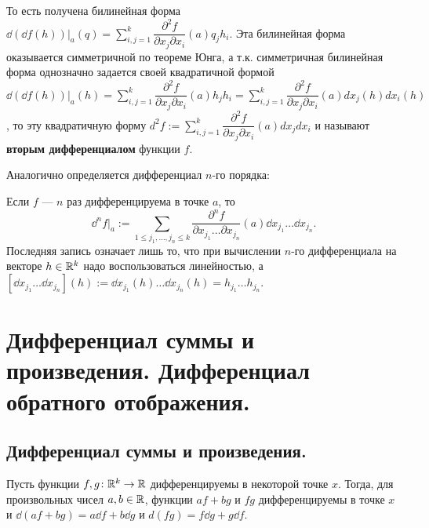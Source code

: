\documentclass[a4paper]{article}
\theoremstyle{named}
\begin{document}
    То есть получена билинейная форма
    $\dd(\dd f(h))\bigl|_a (q)=\sum\limits_{i,j=1}^{k}\dfrac{\partial^2 f}{\partial x_j\partial x_i}(a)q_jh_i$.
    Эта билинейная форма оказывается симметричной по теореме Юнга, а т.к. симметричная билинейная форма однозначно задается своей квадратичной формой
    $\dd(\dd f(h))\bigl|_a (h) = \sum\limits_{i,j=1}^{k}\dfrac{\partial^2 f}{\partial x_j\partial x_i}(a)h_jh_i
    =\sum\limits_{i,j=1}^{k}\dfrac{\partial^2 f}{\partial x_j\partial x_i}(a)dx_j(h)dx_i(h)$,
    то эту квадратичную форму $d^2f:=\sum\limits_{i,j=1}^{k}\dfrac{\partial^2 f}{\partial x_j\partial x_i}(a)dx_jdx_i$
    и называют {\bf вторым дифференциалом} функции $f$.

    Аналогично определяется дифференциал $n$-го порядка:

    \begin{definition*}
        Если $f$ --- $n$ раз дифференцируема в точке $a$, то
        $$
            \dd^nf\bigl|_a:=\sum\limits_{1 \leq j_1,\ldots, j_n \leq k}
            \dfrac{\partial^n f}{\partial x_{j_1}\ldots\partial x_{j_n}}(a)\dd x_{j_1}\ldots \dd x_{j_n}.
        $$
        Последняя запись означает лишь то, что при вычислении $n$-го дифференциала на векторе $h\in \mathbb{R}^k$
        надо воспользоваться линейностью, а $[\dd x_{j_1}\ldots \dd x_{j_n}] (h) := \dd x_{j_1}(h)\ldots \dd x_{j_n}(h) = h_{j_1}\ldots h_{j_n}$.
    \end{definition*}

    \section{Дифференциал суммы и произведения. Дифференциал обратного отображения.}

    \subsection{Дифференциал суммы и произведения.}

    \begin{theorem*}
        Пусть функции $f, g \colon \mathbb{R}^k\to \mathbb{R}$ дифференцируемы в некоторой точке $x$. Тогда, для произвольных чисел $a,b \in \mathbb{R}$,
        функции $af + bg$ и $fg$ дифференцируемы в точке $x$ и $\dd(af + bg) = a\dd f + b\dd g$ и $d(fg) = f\dd g + g\dd f$.
    \end{theorem*}
\end{document}
